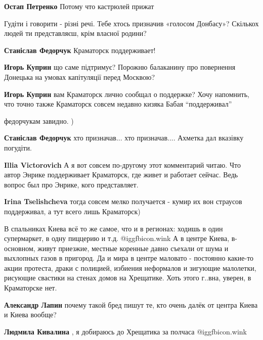 \begin{itemize}
\begin{itemize}
\textbf{Остап Петренко} Потому что кастрюлей прижат
\end{itemize} %


Гудіти і говорити - різні речі. Тебе хтось призначив «голосом Донбасу»?
Скількох людей ти представляєш, крім власної родини?

\begin{itemize} %
\textbf{Станіслав Федорчук} Краматорск поддерживает!

\textbf{Игорь Куприн} що саме підтримує? Порожню балаканину про повернення Донецька на умовах капітуляції перед Москвою?

\textbf{Игорь Куприн} вам Краматорск лично сообщал о поддержке? Хочу напомнить, что точно также Краматорск совсем недавно кизяка Бабая \enquote{поддерживал}

федорчукам завидно. )

\textbf{Станіслав Федорчук} хто призначав... хто призначав....
Ахметка дал вказівку погудіти.

\textbf{Illia Victorovich} А я вот совсем по-другому этот комментарий читаю. Что автор Энрике поддерживает Краматорск, где живет и работает сейчас. Ведь вопрос был про Энрике, кого представляет.

\textbf{Irina Tselishcheva} тогда совсем мелко получается - кумир их вон страусов поддерживал, а тут всего лишь Краматорск)
\end{itemize} %


В спальниках Киева всё то же самое, что и в регионах: ходишь в один
супермаркет, в одну пиццерию и т.д.  @igg{fbicon.wink}  А в центре Киева, в-основном, живут
приезжие, местные коренные давно съехали от шума и выхлопных газов в пригород.
Да и мира в центре маловато - постоянно какие-то акции протеста, драки с
полицией, избиения неформалов и зигующие малолетки, рисующие свастики на стенах
домов на Хрещатике. Хоть этого г..вна, уверен, в Краматорске нет.

\begin{itemize} %
\textbf{Александр Лапин} почему такой бред пишут те, кто очень далёк от центра Киева и Киева вообще?

\textbf{Людмила Кивалина} , я добираюсь до Хрещатика за полчаса  @igg{fbicon.wink} 


\end{itemize}
\end{itemize}

